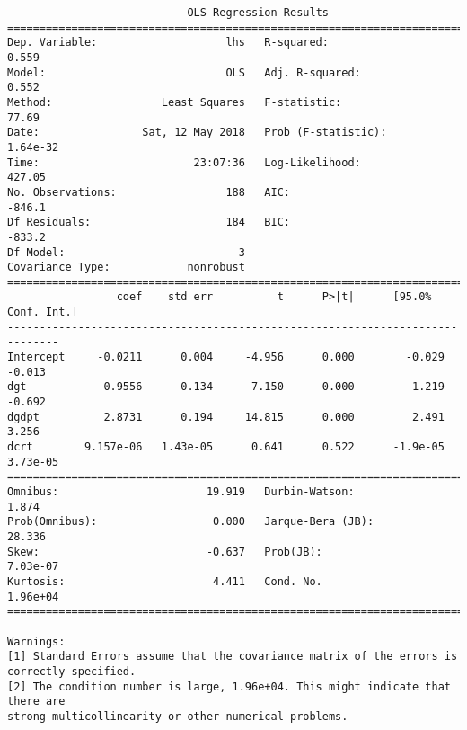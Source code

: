 \documentclass[12pt,fleqn]{article}\usepackage{../../common}
\begin{document}
\begin{verbatim}
                            OLS Regression Results                            
==============================================================================
Dep. Variable:                    lhs   R-squared:                       0.559
Model:                            OLS   Adj. R-squared:                  0.552
Method:                 Least Squares   F-statistic:                     77.69
Date:                Sat, 12 May 2018   Prob (F-statistic):           1.64e-32
Time:                        23:07:36   Log-Likelihood:                 427.05
No. Observations:                 188   AIC:                            -846.1
Df Residuals:                     184   BIC:                            -833.2
Df Model:                           3                                         
Covariance Type:            nonrobust                                         
==============================================================================
                 coef    std err          t      P>|t|      [95.0% Conf. Int.]
------------------------------------------------------------------------------
Intercept     -0.0211      0.004     -4.956      0.000        -0.029    -0.013
dgt           -0.9556      0.134     -7.150      0.000        -1.219    -0.692
dgdpt          2.8731      0.194     14.815      0.000         2.491     3.256
dcrt        9.157e-06   1.43e-05      0.641      0.522      -1.9e-05  3.73e-05
==============================================================================
Omnibus:                       19.919   Durbin-Watson:                   1.874
Prob(Omnibus):                  0.000   Jarque-Bera (JB):               28.336
Skew:                          -0.637   Prob(JB):                     7.03e-07
Kurtosis:                       4.411   Cond. No.                     1.96e+04
==============================================================================

Warnings:
[1] Standard Errors assume that the covariance matrix of the errors is correctly specified.
[2] The condition number is large, 1.96e+04. This might indicate that there are
strong multicollinearity or other numerical problems.
\end{verbatim}
\end{document}
